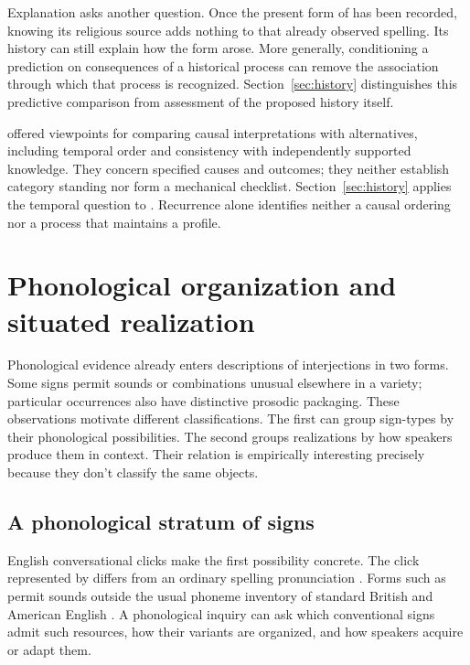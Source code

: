 \documentclass[12pt]{article}
\begin{document}
Explanation asks another question. Once the present form of 
has been recorded, knowing its religious source adds nothing to that
already observed spelling. Its history can still explain how the form
arose. More generally, conditioning a prediction on consequences of a
historical process can remove the association through which that process
is recognized. Section~\ref{sec:history} distinguishes this predictive
comparison from assessment of the proposed history itself.

\textcite[295--299]{hill1965} offered viewpoints for comparing causal
interpretations with alternatives, including temporal order and consistency
with independently supported knowledge. They concern specified causes
and outcomes; they neither establish category standing nor form a
mechanical checklist. Section~\ref{sec:history} applies the temporal
question to . Recurrence alone identifies neither a causal
ordering nor a process that maintains a profile.

\section{Phonological organization and situated realization}\label{sec:phonology}

Phonological evidence already enters descriptions of interjections in two
forms. Some signs permit sounds or combinations unusual elsewhere in a
variety; particular occurrences also have distinctive prosodic packaging.
These observations motivate different classifications. The first can group
sign-types by their phonological possibilities. The second groups realizations
by how speakers produce them in context. Their relation is empirically
interesting precisely because they don't classify the same objects.

\subsection{A phonological stratum of signs}

English conversational clicks make the first possibility concrete. The
click represented by  differs from an ordinary spelling
pronunciation \citep[147]{wilkins1992}. Forms such as  permit
sounds outside the usual phoneme inventory of standard British and
American English \citep[853]{quirk1985}. A phonological inquiry can
ask which conventional signs admit such resources, how their variants are
organized, and how speakers acquire or adapt them.
\end{document}

